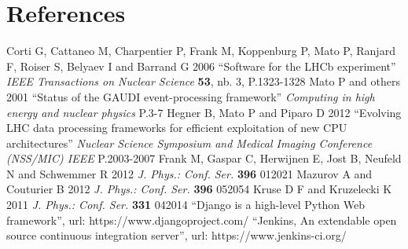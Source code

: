 \documentclass[a4paper]{jpconf}
\begin{document}
\section*{References}

\begin{thebibliography}{9}
 Corti G, Cattaneo M, Charpentier P, Frank M, Koppenburg P, Mato P, Ranjard F, Roiser S, Belyaev I and Barrand G 2006 ``Software for the LHCb experiment'' {\it IEEE Transactions on Nuclear Science} {\bf 53}, nb. 3, P.1323-1328
 Mato P and others 2001 ``Status of the GAUDI event-processing framework'' {\it Computing in high energy and nuclear physics} P.3-7
 Hegner B, Mato P and Piparo D 2012 ``Evolving LHC data processing frameworks for efficient exploitation of new CPU architectures'' {\it Nuclear Science Symposium and Medical Imaging Conference (NSS/MIC) IEEE} P.2003-2007
Frank M, Gaspar C, Herwijnen E, Jost B, Neufeld N and Schwemmer R 2012 {\it J. Phys.: Conf. Ser.} {\bf 396} 012021
 Mazurov A and Couturier B 2012 {\it J. Phys.: Conf. Ser.} {\bf 396} 052054
 Kruse D F and Kruzelecki K 2011 {\it J. Phys.: Conf. Ser.} {\bf 331} 042014	
 ``Django is a high-level Python Web framework'', url: https://www.djangoproject.com/
 ``Jenkins, An extendable open source continuous integration server'', url: https://www.jenkins-ci.org/
\end{thebibliography}
\end{document}
